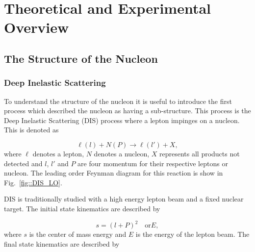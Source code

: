 \chapter{Theoretical and Experimental Overview} \label{ch::theory_exp}
\ifpdf
\graphicspath{{Chapters/Theory/Figs/Raster/}{Chapters/Theory/Figs/PDF/}{Chapters/Theory/Figs/}}
\else \graphicspath{{Chapters/Theory/Figs/Vector/}{Chapters/Theory/Figs/}}
\fi

\section{The Structure of the Nucleon}

\subsection{Deep Inelastic Scattering}
To understand the structure of the nucleon it is useful to introduce the first
process which described the nucleon as having a sub-structure.  This process is
the Deep Inelastic Scattering (DIS) process where a lepton impinges on a
nucleon.  This is denoted as

\begin{equation}
\ell(l) + N(P) \rightarrow \ell(l') + X,
\end{equation}
\noindent
where $\ell$ denotes a lepton, $N$ denotes a nucleon, $X$ represents all
products not detected and $l$, $l'$ and $P$ are four momentum for their
respective leptons or nucleon.  The leading order Feynman diagram for this
reaction is show in Fig.~\ref{fig::DIS_LO}.


DIS is traditionally studied with a high energy lepton beam and a fixed nuclear
target.  The initial state kinematics are described by

\begin{equation}
 s = (l+P)^2 \quad \mathrm{or} E,
\end{equation}
\noindent
where $s$ is the center of mass energy and $E$ is the energy of the lepton beam.
The final state kinematics are described by

\begin{equation}

\end{equation}

